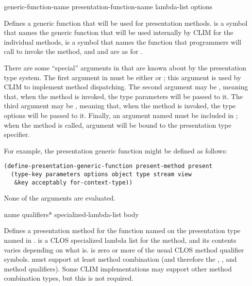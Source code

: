  {generic-function-name
                                                  presentation-function-name
                                                  lambda-list \rest options}

Defines a generic function that will be used for presentation methods.
 is a symbol that names the generic function that
will be used internally by CLIM for the individual methods,
 is a symbol that names the function that
programmers will call to invoke the method, and  and
 are as for .

There are some ``special'' arguments in  that are known about
by the presentation type system.  The first argument in  must
be either  or ; this argument is used by CLIM to
implement method dispatching.  The second argument may be ,
meaning that, when the method is invoked, the type parameters will be passed to
it.  The third argument may be , meaning that, when the method is
invoked, the type options will be passed to it.  Finally, an argument named
 must be included in ; when the method is called,
 argument will be bound to the presentation type specifier.

For example, the  presentation generic function might be defined as
follows:
\begin{verbatim}
(define-presentation-generic-function present-method present
  (type-key parameters options object type stream view
   &key acceptably for-context-type))
\end{verbatim}

None of the arguments are evaluated.


 {name qualifiers* specialized-lambda-list \body body}

Defines a presentation method for the function named  on the
presentation type named in .
 is a CLOS specialized lambda list for the method,
and its contents varies depending on what  is.   is
zero or more of the usual CLOS method qualifier symbols.
 must support at least  method
combination (and therefore the , , and 
method qualifiers).  Some CLIM implementations may support other method
combination types, but this is not required.

